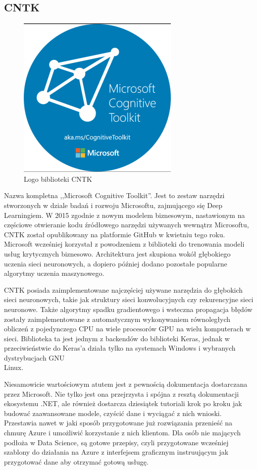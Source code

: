 \documentclass[12pt,a4paper,twoside,titlepage,openright]{book}
\begin{document}
\subsection{CNTK}
\begin{figure}[h]
	\centering
			\includegraphics[resolution=120]{CNTK.png}
		\caption{Logo biblioteki CNTK}
\end{figure}
Nazwa kompletna ,,Microsoft Cognitive Toolkit''. Jest to zestaw narzędzi stworzonych w dziale badań i rozwoju Microsoftu, zajmującego się Deep Learningiem. W 2015 zgodnie z nowym modelem biznesowym, nastawionym na częściowe otwieranie kodu źródłowego narzędzi używanych wewnątrz Microsoftu, CNTK został opublikowany na platformie GitHub w kwietniu tego roku. Microsoft wcześniej korzystał z powodzeniem z biblioteki do trenowania modeli usług krytycznych biznesowo. Architektura jest skupiona wokół głębokiego uczenia sieci neuronowych, a dopiero później dodano pozostałe popularne algorytmy uczenia maszynowego.

CNTK posiada zaimplementowane najczęściej używane narzędzia do głębokich sieci neuronowych, takie jak struktury sieci konwolucyjnych czy rekurencyjne sieci neuronowe. Także algorytmy spadku gradientowego i wsteczna propagacja błędów zostały zaimplementowane z automatycznym wykonywaniem równoległych obliczeń z pojedynczego CPU na wiele procesorów GPU na wielu komputerach w sieci. Biblioteka ta jest jednym z backendów do biblioteki Keras, jednak w przeciwieństwie do Keras'a działa tylko na systemach Windows i wybranych dystrybucjach GNU\\Linux.

Niesamowicie wartościowym atutem jest z pewnością dokumentacja dostarczana przez Microsoft. Nie tylko jest ona przejrzysta i spójna z resztą dokumentacji ekosystemu .NET, ale również dostarcza dziesiątek tutoriali krok po kroku jak budować zaawansowane modele, czyścić dane i wyciągać z nich wnioski. Przestawia nawet w jaki sposób przygotowane już rozwiązania przenieść na chmurę Azure i umożliwić korzystanie z nich klientom. Dla osób nie mających podłoża w Data Science, są gotowe przepisy, czyli przygotowane wcześniej szablony do działania na Azure z interfejsem graficznym instruującym jak przygotować dane aby otrzymać gotową usługę. \cite{book:2187021}
\end{document}
